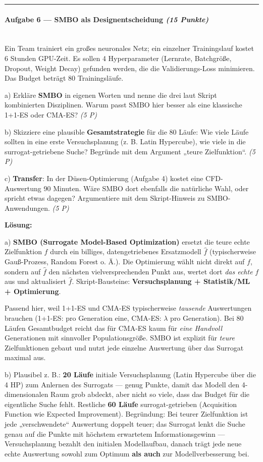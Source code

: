 \documentclass[11pt, a4paper]{article}
\begin{document}
\noindent\textcolor{rulegray}{\rule{\linewidth}{0.4pt}}


\paragraph{Aufgabe 6 — SMBO als Designentscheidung \textit{(15 Punkte)}}\mbox{}\\[2pt]

Ein Team trainiert ein großes neuronales Netz; ein einzelner Trainingslauf kostet 6 Stunden GPU-Zeit. Es sollen 4 Hyperparameter (Lernrate, Batchgröße, Dropout, Weight Decay) gefunden werden, die die Validierungs-Loss minimieren. Das Budget beträgt 80 Trainingsläufe.


a) Erkläre \textbf{SMBO} in eigenen Worten und nenne die drei laut Skript kombinierten Disziplinen. Warum passt SMBO hier besser als eine klassische 1+1-ES oder CMA-ES? \textit{(5 P)}


b) Skizziere eine plausible \textbf{Gesamtstrategie} für die 80 Läufe: Wie viele Läufe sollten in eine erste Versuchsplanung (z. B. Latin Hypercube), wie viele in die surrogat-getriebene Suche? Begründe mit dem Argument „teure Zielfunktion“. \textit{(5 P)}


c) \textbf{Transfer}: In der Düsen-Optimierung (Aufgabe 4) kostet eine CFD-Auswertung 90 Minuten. Wäre SMBO dort ebenfalls die natürliche Wahl, oder spricht etwas dagegen? Argumentiere mit dem Skript-Hinweis zu SMBO-Anwendungen. \textit{(5 P)}


\textbf{Lösung:}


a) \textbf{SMBO (Surrogate Model-Based Optimization)} ersetzt die teure echte Zielfunktion $f$ durch ein billiges, datengetriebenes Ersatzmodell $\hat f$ (typischerweise Gauß-Prozess, Random Forest o. Ä.). Die Optimierung wählt nicht direkt auf $f$, sondern auf $\hat f$ den nächsten vielversprechenden Punkt aus, wertet dort \textit{das echte} $f$ aus und aktualisiert $\hat f$. Skript-Bausteine: \textbf{Versuchsplanung + Statistik/ML + Optimierung}.


Passend hier, weil 1+1-ES und CMA-ES typischerweise \textit{tausende} Auswertungen brauchen (1+1-ES: pro Generation eine, CMA-ES: $\lambda$ pro Generation). Bei 80 Läufen Gesamtbudget reicht das für CMA-ES kaum für \textit{eine Handvoll} Generationen mit sinnvoller Populationsgröße. SMBO ist explizit für \textit{teure} Zielfunktionen gebaut und nutzt jede einzelne Auswertung über das Surrogat maximal aus.


b) Plausibel z. B.: \textbf{20 Läufe} initiale Versuchsplanung (Latin Hypercube über die 4 HP) zum Anlernen des Surrogats — genug Punkte, damit das Modell den 4-dimensionalen Raum grob abdeckt, aber nicht so viele, dass das Budget für die eigentliche Suche fehlt. Restliche \textbf{60 Läufe} surrogat-getrieben (Acquisition Function wie Expected Improvement). Begründung: Bei teurer Zielfunktion ist jede „verschwendete“ Auswertung doppelt teuer; das Surrogat lenkt die Suche genau auf die Punkte mit höchstem erwartetem Informationsgewinn — Versuchsplanung bezahlt den initialen Modellaufbau, danach trägt jede neue echte Auswertung sowohl zum Optimum \textbf{als auch} zur Modellverbesserung bei.
\end{document}
